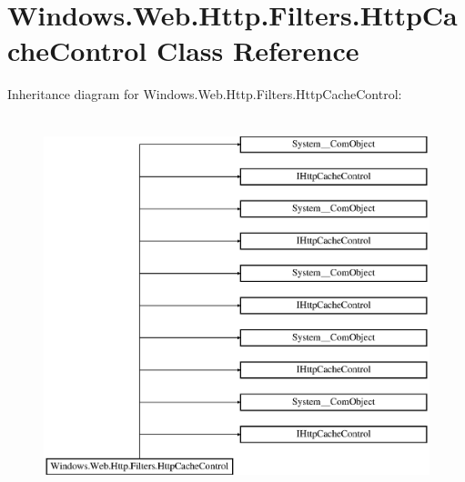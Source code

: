 \hypertarget{class_windows_1_1_web_1_1_http_1_1_filters_1_1_http_cache_control}{}\section{Windows.\+Web.\+Http.\+Filters.\+Http\+Cache\+Control Class Reference}
\label{class_windows_1_1_web_1_1_http_1_1_filters_1_1_http_cache_control}
Inheritance diagram for Windows.\+Web.\+Http.\+Filters.\+Http\+Cache\+Control\+:\begin{figure}[H]
\begin{center}
\leavevmode
\includegraphics[height=11.000000cm]{class_windows_1_1_web_1_1_http_1_1_filters_1_1_http_cache_control}
\end{center}
\end{figure}
